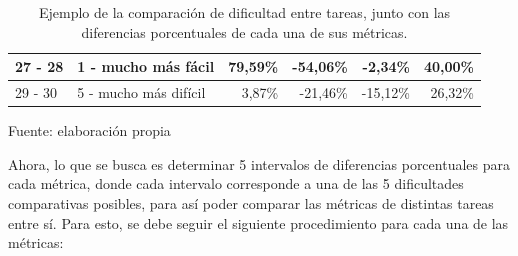 \documentclass[letterpaper,12pt]{article}
\begin{document}
\begin{table}[H]
\begin{tabular}{|l|l|r|r|r|r|}
    27 - 28         & 1 - mucho más fácil                                                            & 79,59\%                                                                                                   & -54,06\%                                                                                       & -2,34\%                                                                                   & 40,00\%                                                                                  \\ \hline
    29 - 30         & 5 - mucho más difícil                                                          & 3,87\%                                                                                                    & -21,46\%                                                                                       & -15,12\%                                                                                  & 26,32\%                                                                                  \\ \hline
  \end{tabular}
  \caption{Ejemplo de la comparación de dificultad entre tareas, junto con las diferencias porcentuales de cada una de sus métricas.} Fuente: elaboración propia
  \label{tab:example-tasks-comparision}
\end{table}

Ahora, lo que se busca es determinar 5 intervalos de diferencias porcentuales para cada métrica, donde cada intervalo corresponde a una de las 5 dificultades comparativas posibles, para así poder comparar las métricas de distintas tareas entre sí. Para esto, se debe seguir el siguiente procedimiento para cada una de las métricas:
\end{document}
